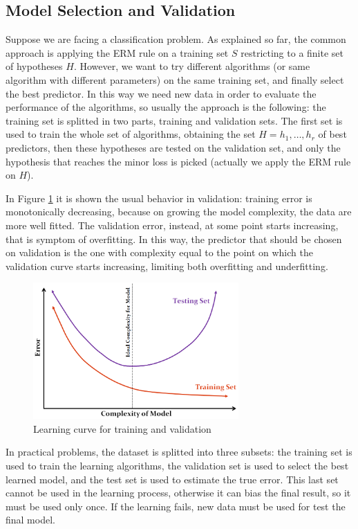 \subsection{Model Selection and Validation}
Suppose we are facing a classification problem. As explained so far, the common approach is applying the ERM rule on a training set $S$ restricting to a finite set of hypotheses $H$. However, we want to try different algorithms (or same algorithm with different parameters) on the same training set, and finally select the best predictor. In this way we need new data in order to evaluate the performance of the algorithms, so usually the approach is the following: the training set is splitted in two parts, training and validation sets. The first set is used to train the whole set of algorithms, obtaining the set $H = {h_1, \dots, h_r}$ of best predictors, then these hypotheses are tested on the validation set, and only the hypothesis that reaches the minor loss is picked (actually we apply the ERM rule on $H$).

In Figure \ref{fig:valid-curve} it is shown the usual behavior in validation: training error is monotonically decreasing, because on growing the model complexity, the data are more well fitted. The validation error, instead, at some point starts increasing, that is symptom of overfitting. In this way, the predictor that should be chosen on validation is the one with complexity equal to the point on which the validation curve starts increasing, limiting both overfitting and underfitting.
\begin{figure}
	\centering
	\includegraphics[width=0.7\textwidth]{figures/validation-lern-curve.png}
	\caption{Learning curve for training and validation}
	\label{fig:valid-curve}
\end{figure}

In practical problems, the dataset is splitted into three subsets: the training set is used to train the learning algorithms, the validation set is used to select the best learned model, and the test set is used to estimate the true error. This last set cannot be used in the learning process, otherwise it can bias the final result, so it must be used only once. If the learning fails, new data must be used for test the final model.


